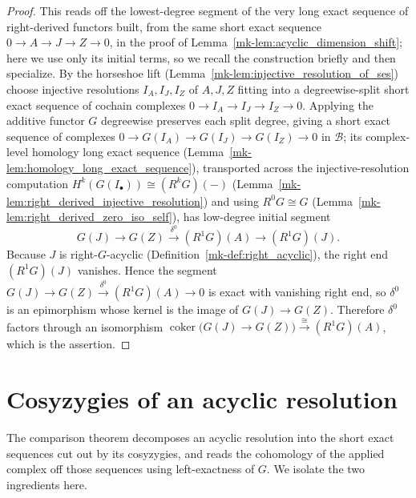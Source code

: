 \begin{proof}
  \leanok
    This reads off the lowest-degree segment of the very long exact sequence of
  right-derived functors built, from the same short exact sequence
  \(0 \to A \to J \to Z \to 0\), in the proof of
  Lemma~\ref{mk-lem:acyclic_dimension_shift}; here we use only its initial terms, so we
  recall the construction briefly and then specialize. By the horseshoe lift
  (Lemma~\ref{mk-lem:injective_resolution_of_ses}) choose injective resolutions
  \(I_A, I_J, I_Z\) of \(A, J, Z\) fitting into a degreewise-split short exact
  sequence of cochain complexes \(0 \to I_A \to I_J \to I_Z \to 0\). Applying the
  additive functor \(G\) degreewise preserves each split degree, giving a short exact
  sequence of complexes \(0 \to G(I_A) \to G(I_J) \to G(I_Z) \to 0\) in
  \(\mathcal{B}\); its complex-level homology long exact sequence
  (Lemma~\ref{mk-lem:homology_long_exact_sequence}), transported across the
  injective-resolution computation \(H^k(G(I_\bullet)) \cong (R^k G)(-)\)
  (Lemma~\ref{mk-lem:right_derived_injective_resolution}) and using
  \(R^0 G \cong G\) (Lemma~\ref{mk-lem:right_derived_zero_iso_self}), has low-degree
  initial segment
  \[
    G(J) \to G(Z) \xrightarrow{\ \delta^0\ } (R^1 G)(A) \to (R^1 G)(J).
  \]
  Because \(J\) is right-\(G\)-acyclic (Definition~\ref{mk-def:right_acyclic}), the right
  end \((R^1 G)(J)\) vanishes. Hence the segment
  \(G(J) \to G(Z) \xrightarrow{\ \delta^0\ } (R^1 G)(A) \to 0\) is exact with vanishing
  right end, so \(\delta^0\) is an epimorphism whose kernel is the image of
  \(G(J) \to G(Z)\). Therefore \(\delta^0\) factors through an isomorphism
  \(\operatorname{coker}\bigl(G(J) \to G(Z)\bigr) \xrightarrow{\ \cong\ } (R^1 G)(A)\),
  which is the assertion.
\end{proof}

\section{Cosyzygies of an acyclic resolution}

The comparison theorem decomposes an acyclic resolution into the short exact
sequences cut out by its cosyzygies, and reads the cohomology of the applied complex
off those sequences using left-exactness of \(G\). We isolate the two ingredients
here.


